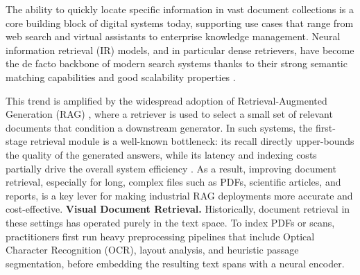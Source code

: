 The ability to quickly locate specific information in vast document collections is a core building block of digital systems today, supporting use cases that range from web search and virtual assistants to enterprise knowledge management. Neural information retrieval (IR) models, and in particular dense retrievers, have become the de facto backbone of modern search systems thanks to their strong semantic matching capabilities and good scalability properties \citep{reimers_sentence-bert_2019, karpukhin_dense_2020, wang_text_2022}.  

This trend is amplified by the widespread adoption of Retrieval-Augmented Generation (RAG) \citep{lewis_retrieval-augmented_2020}, where a retriever is used to select a small set of relevant documents that condition a downstream generator. In such systems, the first-stage retrieval module is a well-known bottleneck: its recall directly upper-bounds the quality of the generated answers, while its latency and indexing costs partially drive the overall system efficiency \citep{lin-byrne-2022-retrieval}. As a result, improving document retrieval, especially for long, complex files such as PDFs, scientific articles, and reports, is a key lever for making industrial RAG deployments more accurate and cost-effective.
\textbf{Visual Document Retrieval.} Historically, document retrieval in these settings has operated purely in the text space. To index PDFs or scans, practitioners first run heavy preprocessing pipelines that include Optical Character Recognition (OCR), layout analysis, and heuristic passage segmentation, before embedding the resulting text spans with a neural encoder. 
